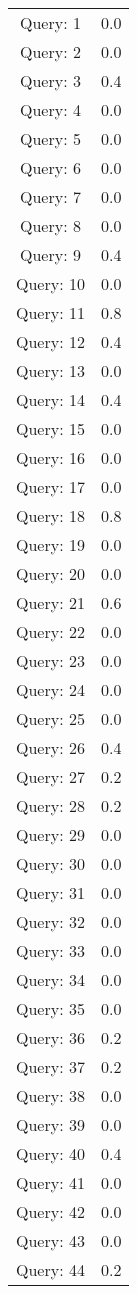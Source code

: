 \begin{table}[hbtp]
\centering
\begin{tabular}{cc}
Query: 1&0.0
\\
Query: 2&0.0
\\
Query: 3&0.4
\\
Query: 4&0.0
\\
Query: 5&0.0
\\
Query: 6&0.0
\\
Query: 7&0.0
\\
Query: 8&0.0
\\
Query: 9&0.4
\\
Query: 10&0.0
\\
Query: 11&0.8
\\
Query: 12&0.4
\\
Query: 13&0.0
\\
Query: 14&0.4
\\
Query: 15&0.0
\\
Query: 16&0.0
\\
Query: 17&0.0
\\
Query: 18&0.8
\\
Query: 19&0.0
\\
Query: 20&0.0
\\
Query: 21&0.6
\\
Query: 22&0.0
\\
Query: 23&0.0
\\
Query: 24&0.0
\\
Query: 25&0.0
\\
Query: 26&0.4
\\
Query: 27&0.2
\\
Query: 28&0.2
\\
Query: 29&0.0
\\
Query: 30&0.0
\\
Query: 31&0.0
\\
Query: 32&0.0
\\
Query: 33&0.0
\\
Query: 34&0.0
\\
Query: 35&0.0
\\
Query: 36&0.2
\\
Query: 37&0.2
\\
Query: 38&0.0
\\
Query: 39&0.0
\\
Query: 40&0.4
\\
Query: 41&0.0
\\
Query: 42&0.0
\\
Query: 43&0.0
\\
Query: 44&0.2
\\

\end{tabular}
\end{table}
